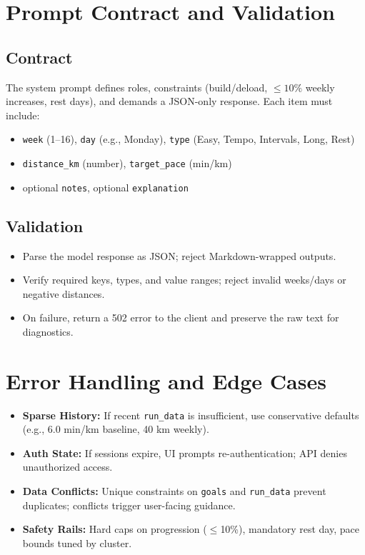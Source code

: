 \section{Prompt Contract and Validation}

\subsection*{Contract}
The system prompt defines roles, constraints (build/deload, \(\leq 10\%\) weekly increases, rest days), and demands a JSON-only response. Each item must include:
\begin{itemize}
  \item \texttt{week} (1--16), \texttt{day} (e.g., Monday), \texttt{type} (Easy, Tempo, Intervals, Long, Rest)
  \item \texttt{distance\_km} (number), \texttt{target\_pace} (min/km)
  \item optional \texttt{notes}, optional \texttt{explanation}
\end{itemize}

\subsection*{Validation}
\begin{itemize}
  \item Parse the model response as JSON; reject Markdown-wrapped outputs.
  \item Verify required keys, types, and value ranges; reject invalid weeks/days or negative distances.
  \item On failure, return a 502 error to the client and preserve the raw text for diagnostics.
\end{itemize}

\section{Error Handling and Edge Cases}
\begin{itemize}
  \item \textbf{Sparse History:} If recent \texttt{run\_data} is insufficient, use conservative defaults (e.g., 6.0 min/km baseline, 40 km weekly).
  \item \textbf{Auth State:} If sessions expire, UI prompts re-authentication; API denies unauthorized access.
  \item \textbf{Data Conflicts:} Unique constraints on \texttt{goals} and \texttt{run\_data} prevent duplicates; conflicts trigger user-facing guidance.
  \item \textbf{Safety Rails:} Hard caps on progression (\(\leq\)10\%), mandatory rest day, pace bounds tuned by cluster.
\end{itemize}

